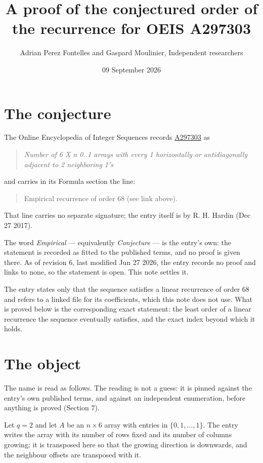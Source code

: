 \documentclass[11pt]{article}
\title{A proof of the conjectured order of the recurrence for OEIS A297303}
\author{Adrian Perez Fontelles and Gaspard Moulinier, Independent researchers}
\date{09 September 2026}
\theoremstyle{definition}
\begin{document}
\maketitle
\section{The conjecture}

The Online Encyclopedia of Integer Sequences records \href{https://oeis.org/A297303}{A297303} as

\begin{quote}\itshape Number of 6 X n 0..1 arrays with every 1 horizontally or antidiagonally adjacent to 2 neighboring 1's\end{quote}

and carries in its Formula section the line:

\begin{quote}\ttfamily Empirical recurrence of order 68 (see link above).\end{quote}

That line carries no separate signature; the entry itself is by R. H. Hardin (Dec 27 2017).

The word {\itshape Empirical} --- equivalently {\itshape Conjecture} --- is the entry's own: the statement is recorded as fitted to the published terms, and no proof is given there. As of revision 6, last modified Jun 27 2026, the entry records no proof and links to none, so the statement is open. This note settles it.

The entry states only that the sequence satisfies a linear recurrence of order $68$ and refers to a linked file for its coefficients, which this note does not use. What is proved below is the corresponding exact statement: the least order of a linear recurrence the sequence eventually satisfies, and the exact index beyond which it holds.

\section{The object}

The name is read as follows. The reading is not a guess: it is pinned against the entry's own published terms, and against an independent enumeration, before anything is proved (Section 7).

Let $q = 2$ and let $A$ be an $n \times 6$ array with entries in $\{0,1,\dots,1\}$. The entry writes the array with its number of rows fixed and its number of columns growing; it is transposed here so that the growing direction is downwards, and the neighbour offsets are transposed with it.
\end{document}
